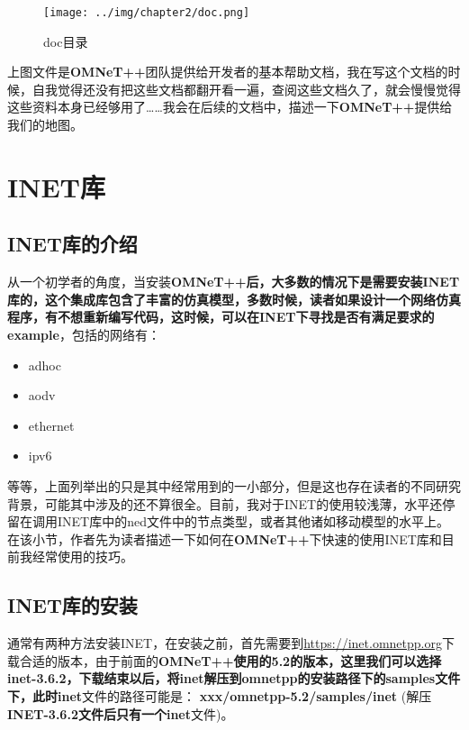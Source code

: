 \begin{figure}[htbp]
\centering
\texttt{[image: ../img/chapter2/doc.png]}
\caption{doc目录}
\end{figure}

上图文件是\textbf{OMNeT++}团队提供给开发者的基本帮助文档，我在写这个文档的时候，自我觉得还没有把这些文档都翻开看一遍，查阅这些文档久了，就会慢慢觉得这些资料本身已经够用了{\ldots}{\ldots}我会在后续的文档中，描述一下\textbf{OMNeT++}提供给我们的地图。

\section{INET库}
\label{inet库}

\subsection{INET库的介绍}
\label{inet库的介绍}

从一个初学者的角度，当安装\textbf{OMNeT++\textbf{后，大多数的情况下是需要安装INET库的，这个集成库包含了丰富的仿真模型，多数时候，读者如果设计一个网络仿真程序，有不想重新编写代码，这时候，可以在INET下寻找是否有满足要求的}example}，包括的网络有：

\begin{itemize}
\item adhoc

\item aodv

\item ethernet

\item ipv6

\end{itemize}

等等，上面列举出的只是其中经常用到的一小部分，但是这也存在读者的不同研究背景，可能其中涉及的还不算很全。目前，我对于INET的使用较浅薄，水平还停留在调用INET库中的ned文件中的节点类型，或者其他诸如移动模型的水平上。在该小节，作者先为读者描述一下如何在\textbf{OMNeT++}下快速的使用INET库和目前我经常使用的技巧。

\subsection{INET库的安装}
\label{inet库的安装}

通常有两种方法安装INET，在安装之前，首先需要到\href{https://inet.omnetpp.org}{https:\slash \slash inet.omnetpp.org}下载合适的版本，由于前面的\textbf{OMNeT++\textbf{使用的}5.2\textbf{的版本，这里我们可以选择}inet-3.6.2\textbf{，下载结束以后，将inet解压到omnetpp的安装路径下的samples文件下，此时}inet}文件的路径可能是：
\textbf{xxx\slash omnetpp-5.2\slash samples\slash inet}
(解压\textbf{INET-3.6.2\textbf{文件后只有一个}inet}文件)。

